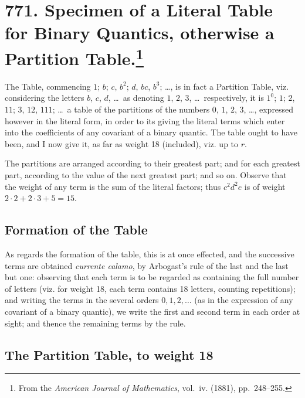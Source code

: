 \documentclass[11pt,a4paper]{article}
\theoremstyle{definition}
\begin{document}
\newpage
\section[Specimen of a Literal Table for Binary Quantics, otherwise a Partition Table]{771. Specimen of a Literal Table for Binary Quantics, otherwise a Partition Table.\footnote{From the \textit{American Journal of Mathematics}, vol.~iv. (1881), pp.~248--255.}}

The Table, commencing $1$; $b$; $c$, $b^2$; $d$, $bc$, $b^3$; \dots, is in fact a Partition Table, viz. considering the letters $b$, $c$, $d$, \dots\ as denoting $1$, $2$, $3$, \dots\ respectively, it is $1^0$; $1$; $2$, $11$; $3$, $12$, $111$; \dots\ a table of the partitions of the numbers $0$, $1$, $2$, $3$, \dots, expressed however in the literal form, in order to its giving the literal terms which enter into the coefficients of any covariant of a binary quantic. The table ought to have been, and I now give it, as far as weight 18 (included), viz. up to $r$.

The partitions are arranged according to their greatest part; and for each greatest part, according to the value of the next greatest part; and so on. Observe that the weight of any term is the sum of the literal factors; thus $c^2d^2e$ is of weight $2\cdot 2 + 2\cdot 3 + 5 = 15$.

\subsection*{Formation of the Table}

As regards the formation of the table, this is at once effected, and the successive terms are obtained \textit{currente calamo}, by Arbogast's rule of the last and the last but one: observing that each term is to be regarded as containing the full number of letters (viz. for weight 18, each term contains 18 letters, counting repetitions); and writing the terms in the several orders $0, 1, 2, \dots$ (as in the expression of any covariant of a binary quantic), we write the first and second term in each order at sight; and thence the remaining terms by the rule.

\subsection*{The Partition Table, to weight 18}
\end{document}
